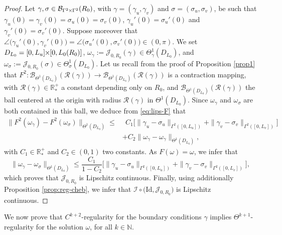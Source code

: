 \documentclass{article}
\newcommand{\I}{\mathcal{I}}
\newcommand{\RR}{\mathcal{R}}
\newcommand{\PLH}{{\mkern-1mu\times\mkern-1mu}}
\newcommand{\Times}{\PLH}
\newcommand{\R}{\mathbb{R}}
\newcommand{\EN}{\mathbb{N}}
\newcommand{\J}{\mathcal{J}}
\theoremstyle{remark}
\theoremstyle{prpart}
\newcommand{\B}{\mathcal{B}}
\newcommand{\Id}{\mathrm{Id}}
\begin{document}
\begin{proof}
   Let $\gamma,\sigma\in\B_{\Gamma^2\Times\Gamma^2}(R_0)$, with $\gamma=(\gamma_u,\gamma_v)$ and $\sigma=(\sigma_u,\sigma_v)$, be such that $\gamma_u(0)=\gamma_v(0) = \sigma_u(0)=\sigma_v(0)$, $\gamma_u'(0)=\sigma_u'(0)$ and $\gamma_v'(0)=\sigma_v'(0)$. Suppose moreover that $\angle\big(\gamma_u'(0),\gamma_v'(0)\big) = \angle\big(\sigma_u'(0),\sigma_v'(0)\big)\in(0,\pi)$. We set $D_{L_0} = [0,L_u]\Times[0,L_0(R_0)]$, $\omega_\gamma:=\J_{0,R_0}(\gamma)\in\Theta^1_\gamma(D_{L_0})$, and $\omega_\sigma:=\J_{0,R_0}(\sigma)\in\Theta^1_\sigma(D_{L_0})$. Let us recall from the proof of Proposition \ref{prop1} that $F^2:\B_{\Theta^1(D_{L_0})}(\RR(\gamma))\to \B_{\Theta^1(D_{L_0})}(\RR(\gamma))$ is a contraction mapping, with $\RR(\gamma)\in\R^+_\ast$ a constant depending only on $R_0$, and $\B_{\Theta^1(D_{L_0})}(\RR(\gamma))$ the ball centered at the origin with radius $\RR(\gamma)$ in $\Theta^1(D_{L_0})$. Since $\omega_\gamma$ and $\omega_\sigma$ are both contained in this ball, we deduce from \eqref{eq:lips-F} that
\begin{equation*}
\begin{split}
\|F^2(\omega_\gamma)-F^2(\omega_\sigma)\|_{\Theta^1(D_{L_0})}\leq&~~ C_1\Big[\|\gamma_u-\sigma_u\|_{\Gamma^2([0,L_u])} + \|\gamma_v-\sigma_v\|_{\Gamma^2([0,L_v])}\Big] \\
&+ C_2\|\omega_\gamma-\omega_\gamma\|_{\Theta^1(D_{L_0})},
\end{split}
\end{equation*}
with $C_1\in\R^+_\ast$ and $C_2\in(0,1)$ two constants. As $F(\omega)=\omega$, we infer that
\begin{equation*}
\|\omega_\gamma-\omega_\sigma\|_{\Theta^1(D_{L_0})}\leq \frac{C_1}{1-C_2} \Big[\|\gamma_u-\sigma_u\|_{\Gamma^2([0,L_u])} + \|\gamma_v-\sigma_v\|_{\Gamma^2([0,L_v])}\Big],
\end{equation*} 
which proves that $\J_{0,R_0}$ is Lipschitz continuous. Finally, using additionally Proposition \ref{prop:reg-cheb}, we infer that $\I\circ \big(\Id,\J_{0,R_0}\big)$ is Lipschitz continuous.
\end{proof}
We now prove that $C^{k+2}$-regularity for the boundary conditions $\gamma$ implies $\Theta^{k+1}$-regularity for the solution $\omega$, for all $k\in\EN$.
\end{document}
